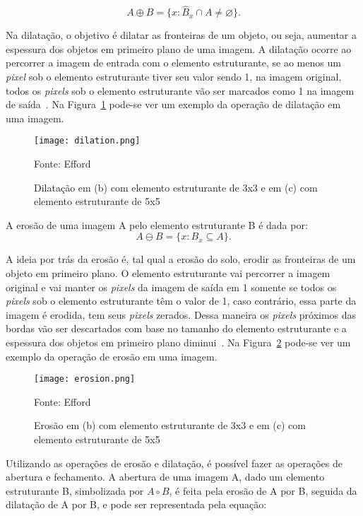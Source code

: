 \begin{displaymath}
A \oplus B = \{x : {\hat{B}}_x \cap A \neq \varnothing \}. 
\end{displaymath}

Na dilatação, o objetivo é dilatar as fronteiras de um objeto, ou seja, aumentar a espessura dos objetos em primeiro plano de uma imagem. A dilatação ocorre ao percorrer a imagem de entrada com o elemento estruturante, se ao menos um \emph{pixel} sob o elemento estruturante tiver seu valor sendo 1, na imagem original, todos os \emph{pixels} sob o elemento estruturante vão ser marcados como 1 na imagem de saída~\cite{opencv2014morph}. Na Figura~\ref{fig:dilation_ex} pode-se ver um exemplo da operação de dilatação em uma imagem.

\begin{figure}[H]
	\centering
	\texttt{[image: dilation.png]}
	\caption{Dilatação em (b) com elemento estruturante de 3x3 e em (c) com elemento estruturante de 5x5}
Fonte: Efford~\cite{efford2000digital}
	\label{fig:dilation_ex}
\end{figure}

A erosão de uma imagem A pelo elemento estruturante B é dada por:
\begin{displaymath}
A \ominus B = \{ x : B_x \subseteq A \}. 
\end{displaymath}

A ideia por trás da erosão é, tal qual a erosão do solo, erodir as fronteiras de um objeto em primeiro plano. O elemento estruturante vai percorrer a imagem original e vai manter os \emph{pixels} da imagem de saída em 1 somente se todos os \emph{pixels} sob o elemento estruturante têm o valor de 1, caso contrário, essa parte da imagem é erodida, tem seus \emph{pixels} zerados. Dessa maneira os \emph{pixels} próximos das bordas vão ser descartados com base no tamanho do elemento estruturante e a espessura dos objetos em primeiro plano diminui~\cite{opencv2014morph}. Na Figura~\ref{fig:erosion_ex} pode-se ver um exemplo da operação de erosão em uma imagem.

\begin{figure}[H]
	\centering
	\texttt{[image: erosion.png]}
	\caption{Erosão em (b) com elemento estruturante de 3x3 e em (c) com elemento estruturante de 5x5}
Fonte: Efford~\cite{efford2000digital}
	\label{fig:erosion_ex}
\end{figure}

Utilizando as operações de erosão e dilatação, é possível fazer as operações de abertura e fechamento. A abertura de uma imagem A, dado um elemento estruturante B, simbolizada por $A \circ B$, é feita pela erosão de A por B, seguida da dilatação de A por B, e pode ser representada pela equação:

